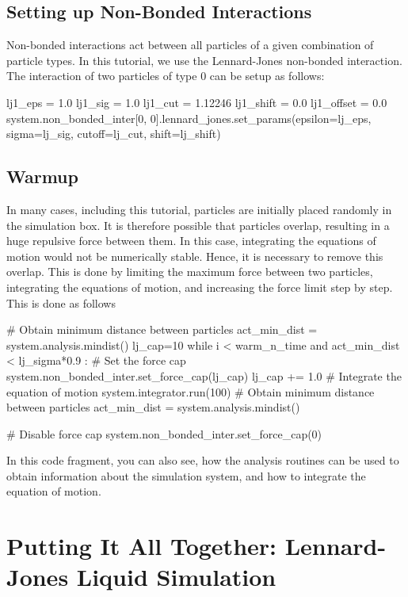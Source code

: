 \documentclass[
paper=a4,                       %
fontsize=11pt,                  %
twoside,                        %
footsepline,                    %
headsepline,                    %
headinclude=false,              %
footinclude=false,              %
pagesize,                       %
]{scrartcl}
\begin{document}
\subsection{Setting up Non-Bonded Interactions}

Non-bonded interactions act between all particles of a given combination of particle types.
In this tutorial, we use the Lennard-Jones non-bonded interaction.
The interaction of two particles of type 0 can be setup as follows:
{\small\vspace{0,2cm}
\begin{pypresso}
lj1_eps     = 1.0
lj1_sig     = 1.0
lj1_cut     = 1.12246
lj1_shift   = 0.0
lj1_offset  = 0.0
system.non_bonded_inter[0, 0].lennard_jones.set_params(epsilon=lj_eps, sigma=lj_sig,
cutoff=lj_cut, shift=lj_shift)
\end{pypresso}
}\vspace{0,2cm}


\subsection{Warmup}

In many cases, including this tutorial, particles are initially placed randomly in the simulation box. It is therefore possible that particles overlap, resulting in a huge repulsive force between them. In this case, integrating the equations of motion would not be numerically stable. Hence, it is necessary to remove this overlap.
This is done by limiting the maximum force between two particles, integrating the equations of motion, and increasing the force limit step by step.
This is done as follows
\begin{pypresso}
# Obtain minimum distance between particles
act_min_dist = system.analysis.mindist()
lj_cap=10
while i < warm_n_time and act_min_dist < lj_sigma*0.9 :
    # Set the force cap
    system.non_bonded_inter.set_force_cap(lj_cap)
    lj_cap += 1.0
    # Integrate the equation of motion
    system.integrator.run(100)
    # Obtain minimum distance between particles
    act_min_dist = system.analysis.mindist()

# Disable force cap
system.non_bonded_inter.set_force_cap(0)
\end{pypresso}
In this code fragment, you can also see, how the analysis routines can be used to obtain information about the simulation system, and how to integrate the equation of motion.


\section{Putting It All Together: Lennard-Jones Liquid Simulation}
\end{document}
